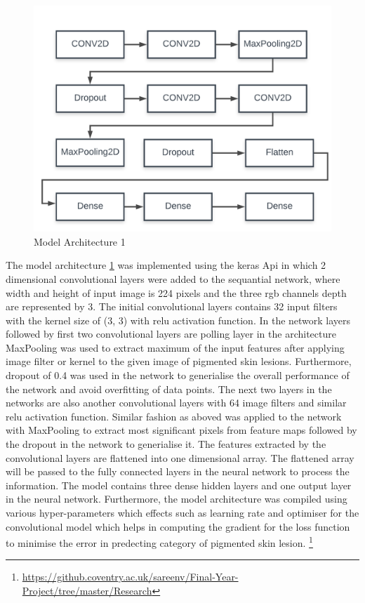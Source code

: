 \begin{figure}[!htp]
    \centering
    \includegraphics[height=.5\textheight]{Images/model.png}
    \caption{Model Architecture 1}
    \label{fig:model1}
\end{figure}
The model architecture \ref{fig:model1} was implemented using the keras Api in which 2 dimensional 
convolutional layers were added to the sequantial network, where width and height of input image is 224 pixels and the three rgb channels depth 
are represented by 3. The initial convolutional layers contains 32 input filters with the kernel size of (3, 3) with relu 
activation function. In the network layers followed by first two convolutional layers are polling layer in the 
architecture MaxPooling was used to extract maximum of the input features after applying image filter or kernel 
to the given image of pigmented skin lesions. Furthermore, dropout of 0.4 was used in the network to generialise the 
overall performance of the network and avoid overfitting of data points. 
The next two layers in the networks are also another convolutional layers with 64 image filters and similar relu activation function. Similar fashion as aboved was 
applied to the network with MaxPooling to extract most significant pixels from feature maps followed by the dropout in the network to generialise it.
The features extracted by the convolutional layers are flattened into one dimensional array. The flattened array will be passed to the fully connected layers in the neural network
to process the information. The model contains three dense hidden layers and one output layer in the neural network.
Furthermore, the model architecture was compiled using various hyper-parameters which effects such as learning rate and 
optimiser for the convolutional model which helps in computing the gradient for the loss function to minimise the error in predecting 
category of pigmented skin lesion.
\footnote{\url{https://github.coventry.ac.uk/sareenv/Final-Year-Project/tree/master/Research}}
\pagebreak

